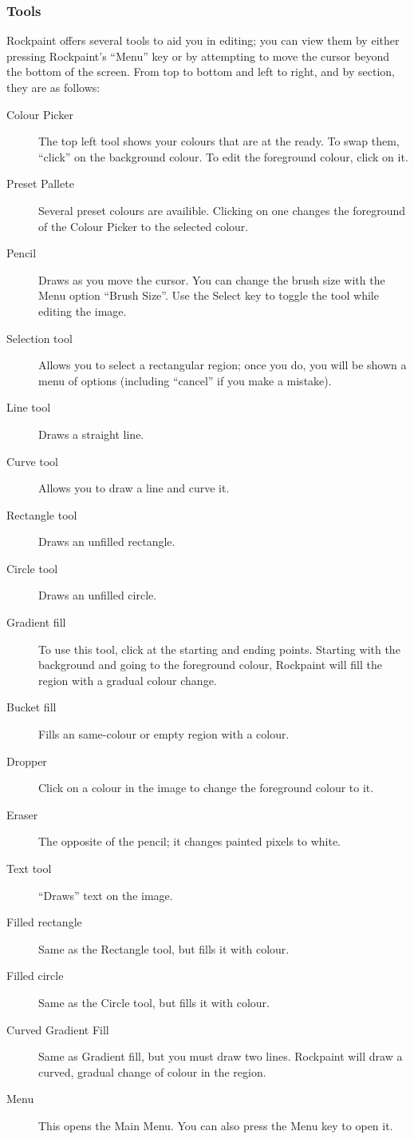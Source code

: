 \subsubsection{Tools}
Rockpaint offers several tools to aid you in editing; you can view them by
either pressing Rockpaint's ``Menu'' key or by attempting to move the cursor
beyond the bottom of the screen. From top to bottom and left to right, and
by section, they are as follows:
\begin{description}
    \item[Colour Picker]
        The top left tool shows your colours that are at the ready. To
        swap them, ``click'' on the background colour. To edit the foreground colour,
        click on it.
    \item[Preset Pallete]
        Several preset colours are availible. Clicking on one changes
        the foreground of the Colour Picker to the selected colour.
    \item[Pencil]
        Draws as you move the cursor. You can change the brush size with the
        Menu option ``Brush Size''. Use the Select key to toggle the tool while editing
        the image.
    \item[Selection tool]
        Allows you to select a rectangular region; once you do, you
        will be shown a menu of options (including ``cancel'' if you make a mistake).
    \item[Line tool]
        Draws a straight line.
    \item[Curve tool]
        Allows you to draw a line and curve it.
    \item[Rectangle tool]
        Draws an unfilled rectangle.
    \item[Circle tool]
        Draws an unfilled circle.
    \item[Gradient fill]
        To use this tool, click at the starting and ending points.
        Starting with the background and going to the foreground colour, Rockpaint
        will fill the region with a gradual colour change.
    \item[Bucket fill]
        Fills an same-colour or empty region with a colour.
    \item[Dropper]
        Click on a colour in the image to change the foreground colour to it.
    \item[Eraser]
        The opposite of the pencil; it changes painted pixels to white.
    \item[Text tool]
        ``Draws'' text on the image.
    \item[Filled rectangle]
        Same as the Rectangle tool, but fills it with colour.
    \item[Filled circle]
        Same as the Circle tool, but fills it with colour.
    \item[Curved Gradient Fill]
        Same as Gradient fill, but you must draw two lines.
        Rockpaint will draw a curved, gradual change of colour in the region.
    \item[Menu]
        This opens the Main Menu. You can also press the Menu key to open it.
\end{description}

